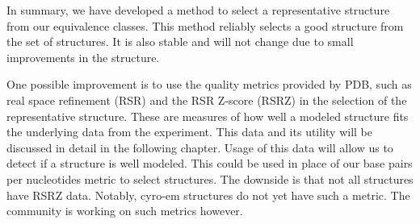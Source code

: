 In summary, we have developed a method to select a representative structure from
our equivalence classes. This method reliably selects a good structure from the
set of structures. It is also stable and will not change due to small
improvements in the structure.

One possible improvement is to use the quality metrics provided by PDB, such as
real space refinement (RSR) and the RSR Z-score (RSRZ) in the selection of the
representative structure. These are measures of how well a modeled structure
fits the underlying data from the experiment. This data and its utility will be
discussed in detail in the following chapter. Usage of this data will allow us
to detect if a structure is well modeled. This could be used in place of our
base pairs per nucleotides metric to select structures. The downside is that not
all structures have RSRZ data. Notably, cyro-em structures do not yet have such
a metric. The community is working on such metrics however.
